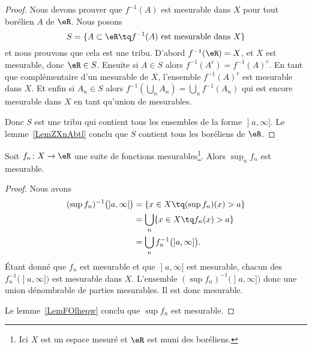 \begin{proof}
    Nous devons prouver que \( f^{-1}(A)\) est mesurable dans \( X\) pour tout borélien \( A\) de \( \eR\). Nous posons
    \begin{equation}
        S=\{ A\subset \eR\tq f^{-1}(A)\text{ est mesurable dans } X \}
    \end{equation}
    et nous prouvons que cela est une tribu. D'abord \( f^{-1}(\eR)=X\), et \( X\) est mesurable, donc \( \eR\in S\). Ensuite si \( A\in S\) alors \( f^{-1}(A^c)=f^{-1}(A)^c\). En tant que complémentaire d'un mesurable de \( X\), l'ensemble \( f^{-1}(A)^c\) est mesurable dans \( X\). Et enfin si \( A_n\in S \) alors \( f^{-1}(\bigcup_nA_n)=\bigcup_nf^{-1}(A_n)\) qui est encore mesurable dans \( X\) en tant qu'union de mesurables.

    Donc \( S\) est une tribu qui contient tous les ensembles de la forme \( \mathopen] a , \infty \mathclose]\). Le lemme~\ref{LemZXnAbtl} conclu que \( S\) contient tous les boréliens de \( \eR\).
\end{proof}

\begin{lemma}   \label{LemIGKvbNR}
    Soit \( f_n\colon X\to \eR\) une suite de fonctions mesurables\footnote{Ici \( X\) est un espace mesuré et \( \eR\) est muni des boréliens.}. Alors \( \sup_n f_n\) est mesurable.
\end{lemma}

\begin{proof}
    Nous avons
    \begin{subequations}
        \begin{align}
            (\sup f_n)^{-1}\big( \mathopen] a , \infty \mathclose] \big)&=\{ x\in X\tq (\sup f_n)(x)>a \}\\
            &=\bigcup_n\{ x\in X\tq f_n(x)>a \}\\
            &=\bigcup_nf_n^{-1}\big( \mathopen] a , \infty \mathclose] \big).
        \end{align}
    \end{subequations}
    Étant donné que \( f_n\) est mesurable et que \( \mathopen] a , \infty \mathclose]\) est mesurable, chacun des \( f_n^{-1}\big( \mathopen] a , \infty \mathclose] \big) \) est mesurable dans \( X\). L'ensemble \( (\sup f_n)^{-1}\big( \mathopen] a , \infty \mathclose] \big)\) donc une union dénombrable de parties mesurables. Il est donc mesurable.

    Le lemme~\ref{LemFOlheqw} conclu que \( \sup f_n\) est mesurable.
\end{proof}


